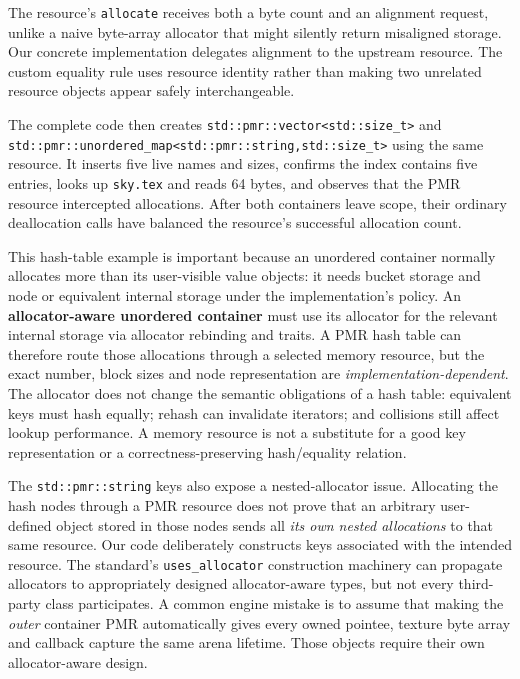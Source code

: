The resource's \texttt{allocate} receives both a byte count and an alignment request, unlike a naive byte-array allocator that might silently return misaligned storage. Our concrete implementation delegates alignment to the upstream resource. The custom equality rule uses resource identity rather than making two unrelated resource objects appear safely interchangeable.

The complete code then creates \texttt{std::pmr::vector\textless{}std::size\_t\textgreater{}} and \texttt{std::pmr::unordered\_map\textless{}std::pmr::string,std::size\_t\textgreater{}} using the same resource. It inserts five live names and sizes, confirms the index contains five entries, looks up \texttt{sky.tex} and reads 64 bytes, and observes that the PMR resource intercepted allocations. After both containers leave scope, their ordinary deallocation calls have balanced the resource's successful allocation count.

This hash-table example is important because an unordered container normally allocates more than its user-visible value objects: it needs bucket storage and node or equivalent internal storage under the implementation's policy. An \textbf{allocator-aware unordered container} must use its allocator for the relevant internal storage via allocator rebinding and traits. A PMR hash table can therefore route those allocations through a selected memory resource, but the exact number, block sizes and node representation are \emph{implementation-dependent}. The allocator does not change the semantic obligations of a hash table: equivalent keys must hash equally; rehash can invalidate iterators; and collisions still affect lookup performance. A memory resource is not a substitute for a good key representation or a correctness-preserving hash/equality relation.

The \texttt{std::pmr::string} keys also expose a nested-allocator issue. Allocating the hash nodes through a PMR resource does not prove that an arbitrary user-defined object stored in those nodes sends all \emph{its own nested allocations} to that same resource. Our code deliberately constructs keys associated with the intended resource. The standard's \texttt{uses\_allocator} construction machinery can propagate allocators to appropriately designed allocator-aware types, but not every third-party class participates. A common engine mistake is to assume that making the \emph{outer} container PMR automatically gives every owned pointee, texture byte array and callback capture the same arena lifetime. Those objects require their own allocator-aware design.

